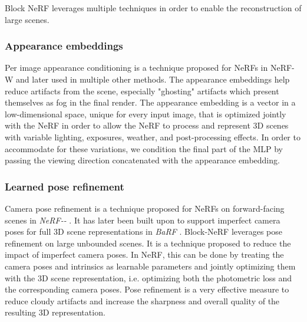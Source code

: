 Block NeRF leverages multiple techniques in order to enable the reconstruction of large scenes.

\subsubsection{Appearance embeddings} \label{sec:appearance-embeddings}
Per image appearance conditioning is a technique proposed for NeRFs in NeRF\nobreakdash-W \cite{martin-brualla_nerf_2021} and later used in multiple other methods. The appearance embeddings help reduce artifacts from the scene, especially "ghosting" artifacts which present themselves as fog in the final render. The appearance embedding is a vector in a low-dimensional space, unique for every input image, that is optimized jointly with the NeRF in order to allow the NeRF to process and represent 3D scenes with variable lighting, exposures, weather, and post-processing effects. In order to accommodate for these variations, we condition the final part of the MLP by passing the viewing direction concatenated with the appearance embedding. 

\subsubsection{Learned pose refinement} \label{sec:camera-pose-refinement}
Camera pose refinement is a technique proposed for NeRFs on forward-facing scenes in \textit{NeRF\nobreakdash-\nobreakdash-} \cite{wang_nerf--_2022}. It has later been built upon to support imperfect camera poses for full 3D scene representations in \textit{BaRF} \cite{lin_barf_2021}. Block-NeRF leverages pose refinement on large unbounded scenes. It is a technique proposed to reduce the impact of imperfect camera poses. In NeRF, this can be done by treating the camera poses and intrinsics as learnable parameters and jointly optimizing them with the 3D scene representation, i.e. optimizing both the photometric loss and the corresponding camera poses. Pose refinement is a very effective measure to reduce cloudy artifacts and increase the sharpness and overall quality of the resulting 3D representation.

